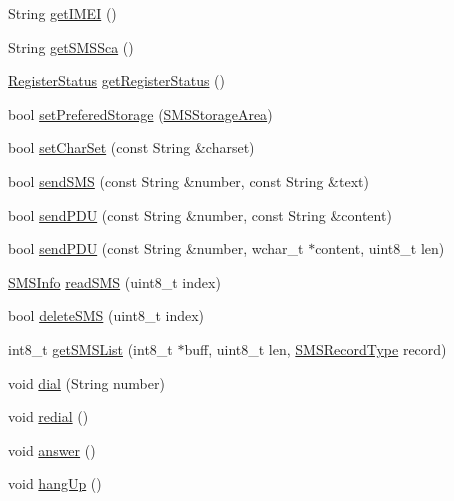 \begin{DoxyCompactItemize}
\item 
String \mbox{\hyperlink{class_a6lib_a365df3e93f910171da9d5914ae1997c2}{get\+I\+M\+EI}} ()
\item 
String \mbox{\hyperlink{class_a6lib_ae1b286d8db58b85e8295a4293ab450db}{get\+S\+M\+S\+Sca}} ()
\item 
\mbox{\hyperlink{_a6lib_8h_a0a43f46ad95cebb665a0d371219a6015}{Register\+Status}} \mbox{\hyperlink{class_a6lib_a7a8beb6c42199ea32f9a73f45f7b500e}{get\+Register\+Status}} ()
\item 
bool \mbox{\hyperlink{class_a6lib_a8d6a63b19eb9bf6d3edb359b05dbc08e}{set\+Prefered\+Storage}} (\mbox{\hyperlink{_a6lib_8h_a683c3425c199702a4b8b13f7f2518af5}{S\+M\+S\+Storage\+Area}})
\item 
bool \mbox{\hyperlink{class_a6lib_abff3a80733dc0964d95ea9b981515f26}{set\+Char\+Set}} (const String \&charset)
\item 
bool \mbox{\hyperlink{class_a6lib_aaf7efdb36c3d8c419a0bf26d5220f91d}{send\+S\+MS}} (const String \&number, const String \&text)
\item 
bool \mbox{\hyperlink{class_a6lib_a0ce431632e4a5e4d26c2d95c83fe7ee5}{send\+P\+DU}} (const String \&number, const String \&content)
\item 
bool \mbox{\hyperlink{class_a6lib_aa9fe9166fe1d7b39bd40dea833844377}{send\+P\+DU}} (const String \&number, wchar\+\_\+t $\ast$content, uint8\+\_\+t len)
\item 
\mbox{\hyperlink{struct_s_m_s_info}{S\+M\+S\+Info}} \mbox{\hyperlink{class_a6lib_aad58cce8168f9554470f3afa854afb29}{read\+S\+MS}} (uint8\+\_\+t index)
\item 
bool \mbox{\hyperlink{class_a6lib_a3b0b2dafb06fda63b9b0ab0ae24e33da}{delete\+S\+MS}} (uint8\+\_\+t index)
\item 
int8\+\_\+t \mbox{\hyperlink{class_a6lib_ac6c57bc2707d968d2ce6c55bdcf22c0c}{get\+S\+M\+S\+List}} (int8\+\_\+t $\ast$buff, uint8\+\_\+t len, \mbox{\hyperlink{_a6lib_8h_a810fca4a55c1c8a606d12c63ed21e041}{S\+M\+S\+Record\+Type}} record)
\item 
void \mbox{\hyperlink{class_a6lib_a8f424e17a31d51ab813698a6f1a8290c}{dial}} (String number)
\item 
void \mbox{\hyperlink{class_a6lib_a49996e929193a3a1942d58c884e919fb}{redial}} ()
\item 
void \mbox{\hyperlink{class_a6lib_a9ed8e337fcaf0400da3e0b2f518a0db5}{answer}} ()
\item 
void \mbox{\hyperlink{class_a6lib_ad5932ea0250881d449d566680a67833e}{hang\+Up}} ()
\item 

\end{DoxyCompactItemize}
